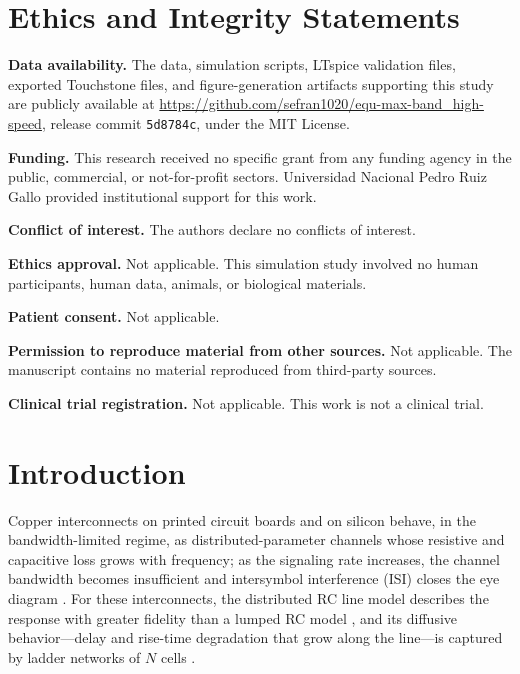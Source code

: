 \documentclass[twocolumn]{USG}
\begin{document}
\maketitle

\section*{Ethics and Integrity Statements}
\textbf{Data availability.} The data, simulation scripts, LTspice validation
files, exported Touchstone files, and figure-generation artifacts supporting
this study are publicly available at
\url{https://github.com/sefran1020/equ-max-band_high-speed}, release commit
\texttt{5d8784c}, under the MIT License.

\textbf{Funding.} This research received no specific grant from any funding agency in the public, commercial, or not-for-profit sectors. Universidad Nacional Pedro Ruiz Gallo provided institutional support for this work.

\textbf{Conflict of interest.} The authors declare no conflicts of interest.

\textbf{Ethics approval.} Not applicable. This simulation study involved no
human participants, human data, animals, or biological materials.

\textbf{Patient consent.} Not applicable.

\textbf{Permission to reproduce material from other sources.} Not
applicable. The manuscript contains no material reproduced from third-party
sources.

\textbf{Clinical trial registration.} Not applicable. This work is not a
clinical trial.

\section{Introduction}
\label{sec:intro}

Copper interconnects on printed circuit boards and on silicon
behave, in the bandwidth-limited regime, as distributed-parameter channels
whose resistive and capacitive loss grows with frequency; as the signaling
rate increases, the channel bandwidth becomes insufficient and intersymbol
interference (ISI) closes the eye diagram \cite{10370948}. For these
interconnects, the distributed RC line model describes the response with
greater fidelity than a lumped RC model \cite{761200}, and its diffusive
behavior---delay and rise-time degradation that grow along the line---is
captured by ladder networks of $N$ cells \cite{5697500}.
\end{document}
